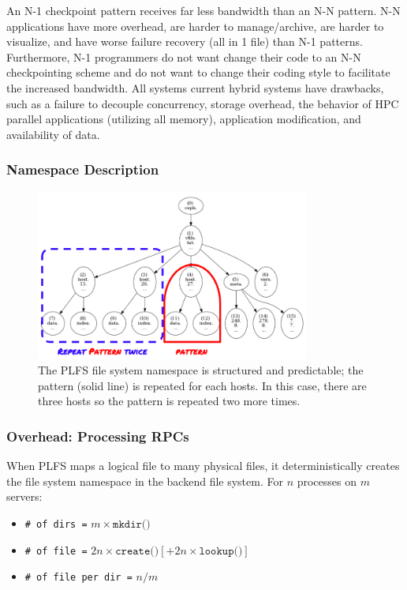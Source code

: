 An N-1 checkpoint pattern receives far less bandwidth than an N-N pattern. N-N
applications have more overhead, are harder to manage/archive, are harder to
visualize, and have worse failure recovery (all in 1 file) than N-1 patterns.
Furthermore, N-1 programmers do not want change their code to an N-N
checkpointing scheme and do not want to change their coding style to facilitate
the increased bandwidth. All systems current hybrid systems have drawbacks,
such as a failure to decouple concurrency, storage overhead, the behavior of
HPC parallel applications (utilizing all memory), application modification, and
availability of data.

\subsubsection{Namespace Description}

\begin{figure}[tb]
\centering
  \includegraphics[width=90mm]{figures/tree_plfs.png} 
  \caption{The PLFS file system namespace is structured and predictable; the
  pattern (solid line) is repeated for each hosts. In this case, there are three
  hosts so the pattern is repeated two more times. 
  }\label{fig:tree_plfs}
\end{figure}

\subsubsection{Overhead: Processing RPCs}

When PLFS maps a logical file to many physical files, it deterministically
creates the file system namespace in the backend file system.  For \(n\)
processes on \(m\) servers:

\begin{itemize}
  \item[] \texttt{\# of dirs =} \(m \times \texttt{mkdir()}\)
  \item[] \texttt{\# of file =} \(2n \times \texttt{create()} [+ 2n \times \texttt{lookup()}]\)
  \item[] \texttt{\# of file per dir =} \(n/m\)
\end{itemize}

